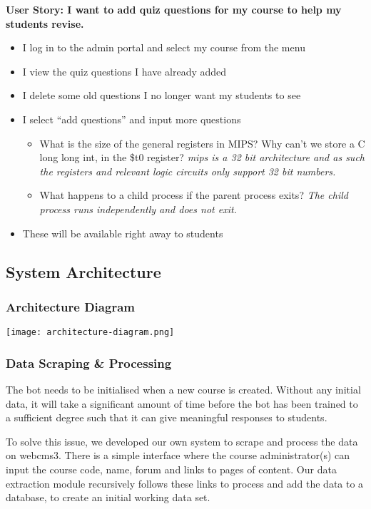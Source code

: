 \textbf{User Story: I want to add quiz questions for my course to help my students revise.}
\begin{itemize}
    \item{I log in to the admin portal and select my course from the menu}
    \item{I view the quiz questions I have already added}
    \item{I delete some old questions I no longer want my students to see}
    \item{I select “add questions” and input more questions}
    \begin{itemize}
        \item{What is the size of the general registers in MIPS? Why can’t we store a C long long int, in the \$t0 register? \textit{mips is a 32 bit architecture and as such the registers and relevant logic circuits only support 32 bit numbers.}}
        \item{What happens to a child process if the parent process exits? \textit{The child process runs independently and does not exit.}}
    \end{itemize}
    \item{These will be available right away to students}
\end{itemize}

\subsection{System Architecture}
\subsubsection{Architecture Diagram}
\texttt{[image: architecture-diagram.png]}

\subsubsection{Data Scraping \& Processing}
The bot needs to be initialised when a new course is created. Without any initial data, it will take a significant amount of time before the bot has been trained to a sufficient degree such that it can give meaningful responses to students.

To solve this issue, we developed our own system to scrape and process the data on webcms3. There is a simple interface where the course administrator(s) can input the course code, name, forum and links to pages of content. Our data extraction module recursively follows these links to process and add the data to a database, to create an initial working data set.


